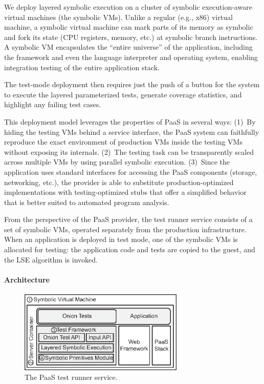We deploy layered symbolic execution on a cluster of symbolic execution-aware virtual machines (the symbolic VMs).
%
Unlike a regular (e.g., x86) virtual machine, a symbolic virtual machine can mark parts of its memory as symbolic and fork its state (CPU registers, memory, etc.) at symbolic branch instructions.
%
A symbolic VM encapsulates the ``entire universe'' of the application, including the framework and even the language interpreter and operating system, enabling integration testing of the entire application stack.

The test-mode deployment then requires just the push of a button for the system to execute the layered parameterized tests, generate coverage statistics, and highlight any failing test cases.

This deployment model leverages the properties of PaaS in several ways:
%
(1)~By hiding the testing VMs behind a service interface, the PaaS system can faithfully reproduce the exact environment of production VMs inside the testing VMs without exposing its internals.
%
(2)~The testing task can be transparently scaled across multiple VMs by using parallel symbolic execution.
%
(3)~Since the application uses standard interfaces for accessing the PaaS components (storage, networking, etc.), the provider is able to substitute production-optimized implementations with testing-optimized stubs that offer a simplified behavior that is better suited to automated program analysis.

From the perspective of the PaaS provider, the test runner service consists of a set of symbolic VMs, operated separately from the production infrastructure.  When an application is deployed in test mode, one of the symbolic VMs is allocated for testing: the application code and tests are copied to the guest, and the LSE algorithm is invoked.

\paragraph{Architecture}

\begin{figure}
  \centering
  \includegraphics[width=0.7\textwidth]{paas/figures/symbolic-vm}
  \caption{The PaaS test runner service.}
  \label{fig:fse}
\end{figure}

